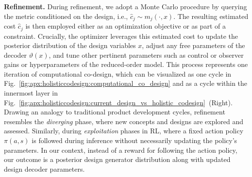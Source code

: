 \textbf{Refinement.}
During refinement, we adopt a Monte Carlo procedure by querying the metric conditioned on the design, i.e., $\hat{c}_j \sim m_j(\cdot, x)$. The resulting estimated cost $\hat{c}_j$ is then employed either as an optimization objective or as part of a constraint. Crucially, the optimizer leverages this estimated cost to update the posterior distribution of the design variables $x$, adjust any free parameters of the decoder $\vartheta(x)$, and tune other pertinent parameters such as control or observer gains or hyperparameters of the reduced-order model. This process represents one iteration of computational co-design, which can be visualized as one cycle in Fig.~\ref{fig:apx:holisticcodesign:computational_co_design} and as a cycle within the innermost layer in Fig.~\ref{fig:apx:holisticcodesign:current_design_vs_holistic_codesign}~(Right). Drawing an analogy to traditional product development cycles, refinement resembles the \emph{diverging} phase, where new concepts and designs are explored and assessed. Similarly, during \emph{exploitation} phases in RL, where a fixed action policy $\pi(a,s)$ is followed during inference without necessarily updating the policy's parameters. In our context, instead of a reward for following the action policy, our outcome is a posterior design generator distribution along with updated design decoder parameters.

